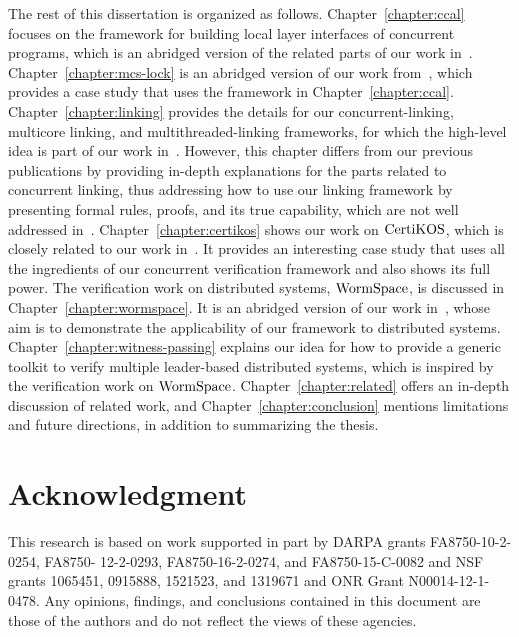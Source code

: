 The rest of this dissertation is organized as follows. 
Chapter~\ref{chapter:ccal}  focuses on the framework for building local layer interfaces of concurrent programs, 
which is an abridged version of the related parts of our work in~\cite{concurrency}.
Chapter~\ref{chapter:mcs-lock} is an abridged version of our work from~\cite{mcslock}, 
which provides a case study that uses the framework in Chapter~\ref{chapter:ccal}. 
Chapter~\ref{chapter:linking} provides the details for our concurrent-linking, multicore linking, and multithreaded-linking frameworks, 
for which the high-level idea is part of our work in~\cite{concurrency}.
However, this chapter differs from our previous publications by providing in-depth explanations for the parts related to concurrent linking, thus addressing how to use our linking framework by presenting formal rules, proofs, and its true capability, 
which are not well addressed in~\cite{concurrency}. 
Chapter~\ref{chapter:certikos}  shows our work on $\mathrm{CertiKOS}$, which is closely related to our work in~\cite{certikos:osdi16}. 
It provides an interesting case study that uses all the ingredients of our concurrent verification framework and also shows its full power. 
The verification work on distributed systems, $\mathrm{WormSpace}$, is discussed in Chapter~\ref{chapter:wormspace}. 
It is an abridged version of our work in~\cite{wormspace}, whose aim is to demonstrate the applicability of our framework to distributed systems. 
Chapter~\ref{chapter:witness-passing}  explains our idea for how to provide a generic toolkit to verify multiple leader-based distributed systems, 
which is inspired by the verification work on $\mathrm{WormSpace}$. 
Chapter~\ref{chapter:related} offers an in-depth discussion of related work, 
and Chapter~\ref{chapter:conclusion}   mentions limitations and future directions, in addition to summarizing the thesis.



\section{Acknowledgment}
This research is based on work supported in part by DARPA grants FA8750-10-2-0254, FA8750- 12-2-0293, FA8750-16-2-0274, and FA8750-15-C-0082 and NSF grants 1065451, 0915888, 1521523, and 1319671 and ONR Grant N00014-12-1-0478. Any opinions, findings, and conclusions contained in this document are those of the authors and do not reflect the views of these agencies.

